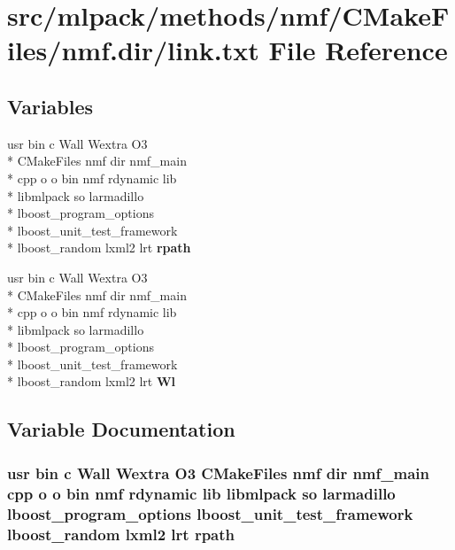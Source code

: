 \section{src/mlpack/methods/nmf/\-C\-Make\-Files/nmf.dir/link.txt File Reference}
\label{methods_2nmf_2CMakeFiles_2nmf_8dir_2link_8txt}
\subsection*{Variables}
\begin{DoxyCompactItemize}
\item 
usr bin c Wall Wextra O3 \\*
C\-Make\-Files nmf dir nmf\-\_\-main \\*
cpp o o bin nmf rdynamic lib \\*
libmlpack so larmadillo \\*
lboost\-\_\-program\-\_\-options \\*
lboost\-\_\-unit\-\_\-test\-\_\-framework \\*
lboost\-\_\-random lxml2 lrt {\bf rpath}
\item 
usr bin c Wall Wextra O3 \\*
C\-Make\-Files nmf dir nmf\-\_\-main \\*
cpp o o bin nmf rdynamic lib \\*
libmlpack so larmadillo \\*
lboost\-\_\-program\-\_\-options \\*
lboost\-\_\-unit\-\_\-test\-\_\-framework \\*
lboost\-\_\-random lxml2 lrt {\bf Wl}
\end{DoxyCompactItemize}


\subsection{Variable Documentation}
\subsubsection[{rpath}]{\setlength{\rightskip}{0pt plus 5cm}usr bin c Wall Wextra O3 C\-Make\-Files nmf dir nmf\-\_\-main cpp o o bin nmf rdynamic lib libmlpack so larmadillo lboost\-\_\-program\-\_\-options lboost\-\_\-unit\-\_\-test\-\_\-framework lboost\-\_\-random lxml2 lrt rpath}\label{methods_2nmf_2CMakeFiles_2nmf_8dir_2link_8txt_ae5e4bacd0351d21283e90a927e32e20b}


